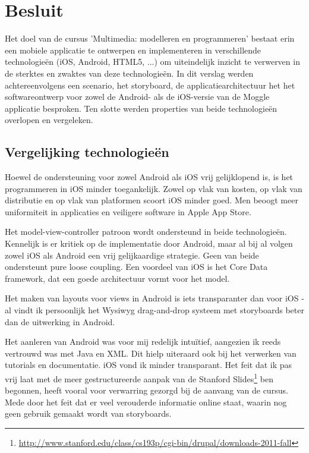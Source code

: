 \chapter{Besluit}\label{chapter:besluit}

Het doel van de cursus 'Multimedia: modelleren en programmeren' bestaat erin een mobiele applicatie te ontwerpen en implementeren in verschillende technologie\"en (iOS, Android, HTML5, ...) om uiteindelijk inzicht te verwerven in de sterktes en zwaktes van deze technologie\"en. In dit verslag werden achtereenvolgens een scenario, het storyboard, de applicatiearchitectuur het het softwareontwerp voor zowel de Android- als de iOS-versie van de Moggle applicatie besproken. Ten slotte werden properties van beide technologie\"en overlopen en vergeleken.

\section{Vergelijking technologie\"en}\label{section:vergelijking_technologieen}

Hoewel de ondersteuning voor zowel Android als iOS vrij gelijklopend is, is het programmeren in iOS minder toegankelijk. Zowel op vlak van kosten, op vlak van distributie en op vlak van platformen scoort iOS minder goed. Men beoogt meer uniformiteit in applicaties en veiligere software in Apple App Store.

Het model-view-controller patroon wordt ondersteund in beide technologie\"en. Kennelijk is er kritiek op de implementatie door Android, maar al bij al volgen zowel iOS als Android een vrij gelijkaardige strategie. Geen van beide ondersteunt pure loose coupling. Een voordeel van iOS is het Core Data framework, dat een goede architectuur vormt voor het model.

Het maken van layouts voor views in Android is iets transparanter dan voor iOS - al vindt ik persoonlijk het Wysiwyg drag-and-drop systeem met storyboards beter dan de uitwerking in Android.

Het aanleren van Android was voor mij redelijk intu\"itief, aangezien ik reeds vertrouwd was met Java en XML. Dit hielp uiteraard ook bij het verwerken van tutorials en documentatie. iOS vond ik minder transparant. Het feit dat ik pas vrij laat met de meer gestructureerde aanpak van de Stanford Slides\footnote{\url{http://www.stanford.edu/class/cs193p/cgi-bin/drupal/downloads-2011-fall}} ben begonnen, heeft vooral voor verwarring gezorgd bij de aanvang van de cursus. Mede door het feit dat er veel verouderde informatie online staat, waarin nog geen gebruik gemaakt wordt van storyboards.

